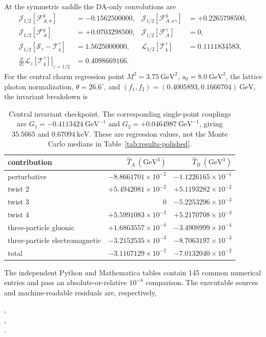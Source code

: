 \documentclass[11pt]{article}
\newcommand{\GeV}{\mathrm{GeV}}
\newcommand{\keV}{\mathrm{keV}}
\begin{document}
At the symmetric saddle the DA-only convolutions are
\begin{align}
 \mathcal J_{1/2}[\mathcal F^g_{A,\sigma}]&=-0.1562500000,&
 \mathcal J_{1/2}[\mathcal F^g_{A,x\gamma}]&=+0.2265798500,\nonumber\\
 \mathcal J_{1/2}[\mathcal F^g_A]&=+0.0703298500,&
 \mathcal J_{1/2}[\mathcal F^\gamma_A]&=0,\nonumber\\
 \mathcal J_{1/2}[\mathcal S_\gamma-\mathcal T_4^\gamma]
 &=1.5625000000,&
 \mathcal L_{1/2}[\mathcal T_4^\gamma]&=0.1111834583,\nonumber\\
 \left.\frac{d}{dz}\mathcal L_z[\mathcal T_4^\gamma]\right|_{z=1/2}
 &=0.4098669166.&&
 \label{eq:app-numerical-convolutions}
\end{align}
For the central charm regression point
$M^2=3.75~\GeV^2$, $s_0=8.0~\GeV^2$, the lattice photon
normalization, $\theta=26.6^\circ$, and
$(f_1,f_2)=(0.4005893,0.1666704)~\GeV$, the invariant breakdown is
\begin{table}[H]
 \centering
 \begin{tabular}{lrr}
  \toprule
  contribution & $\widehat T_A~(\GeV^3)$ & $\widehat T_B~(\GeV^3)$\\
  \midrule
  perturbative & $-8.8661701\times10^{-2}$ & $-1.1226165\times10^{-1}$\\
  twist 2 & $+5.4942081\times10^{-2}$ & $+5.1193282\times10^{-2}$\\
  twist 3 & $0$ & $-5.2253296\times10^{-3}$\\
  twist 4 & $+5.5991083\times10^{-3}$ & $+5.2170708\times10^{-3}$\\
  three-particle gluonic & $+1.6863557\times10^{-4}$ & $-3.4908999\times10^{-4}$\\
  three-particle electromagnetic & $-3.2152535\times10^{-3}$ & $-8.7063197\times10^{-3}$\\
  \midrule
  total & $-3.1167129\times10^{-2}$ & $-7.0132040\times10^{-2}$\\
  \bottomrule
 \end{tabular}
 \caption{Central invariant checkpoint.  The corresponding single-point
 couplings are $G_1=-0.4113424~\GeV^{-1}$ and
 $G_2=+0.0464987~\GeV^{-1}$, giving $35.5665$ and $0.67094~\keV$.
 These are regression values, not the Monte Carlo medians in
 Table~\ref{tab:results-polished}.}
 \label{tab:app-central-invariant-check}
\end{table}
The independent Python and Mathematica tables contain 145 common numerical
entries and pass an absolute-or-relative $10^{-8}$ comparison.  The executable
sources and machine-readable residuals are, respectively,
\begin{center}
\small
{},\\
,\\
.
\end{center}
\end{document}
